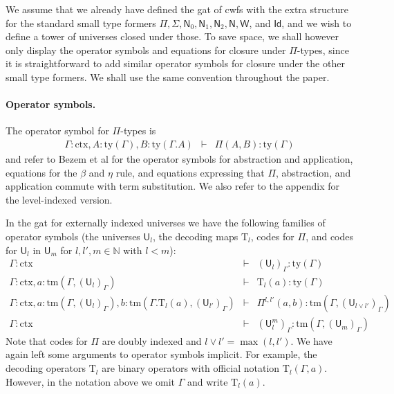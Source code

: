 \documentclass[11pt,a4paper]{article}
\theoremstyle{plain}
\theoremstyle{definition}
\newcommand{\Id}{\mathsf{Id}}
\newcommand{\UU}{\mathsf{U}}
\def\Nbb{\mathbb{N}}
\def\UU{\mathsf{U}}
\newcommand{\N}{\mathsf{N}}
\def\Pihat{\Pi}
\newcommand{\ctx}{\mathrm{ctx}}
\newcommand{\ty}{\mathrm{ty}}
\newcommand{\tm}{\mathrm{tm}}
\def\U{\mathsf{U}}
\newcommand{\Ta}{\mathrm{T}}
\def\W{\mathsf{W}}
\begin{document}
We assume that we already have defined the gat of cwfs with the extra structure for the standard small type formers $\Pi, \Sigma, \N_0, \N_1, \N_2, \N, \W$, and $\Id$, and we wish to define a tower of universes closed under those. To save space, we shall however only display the operator symbols and equations for closure under $\Pi$-types, since it is straightforward to add similar operator symbols for closure under the other small type formers. We shall use the same convention throughout the paper.

\paragraph{Operator symbols.}
The operator symbol for $\Pi$-types is
\begin{eqnarray*}
\Gamma : \ctx, A : \ty(\Gamma), B : \ty(\Gamma.A) &\vdash& \Pi(A,B) : \ty(\Gamma)
\end{eqnarray*}
and refer to Bezem et al \cite{bezem:hofmann} for the operator symbols for abstraction and application, equations for the $\beta$ and $\eta$ rule, and equations expressing that $\Pi$, abstraction, and application commute with term substitution. We also refer to the appendix for the level-indexed version.

In the gat for externally indexed universes we have the following families of operator symbols (the universes $\UU_l$, the decoding maps $\Ta_l$, codes for $\Pi$, and codes for $\UU_l$ in $\UU_m$ for $l, l' , m \in \Nbb$ with $l < m$):
\begin{eqnarray*}
\Gamma : \ctx &\vdash& (\U_{l})_\Gamma : \ty(\Gamma)\\
\Gamma : \ctx, a : \tm(\Gamma,(\U_{l})_\Gamma) &\vdash& {\Ta_{l}}(a) : \ty(\Gamma)\\
\Gamma : \ctx,
a : \tm(\Gamma,(\U_{l})_\Gamma),
b :  \tm(\Gamma . \Ta_{l}(a), (\U_{l'})_\Gamma)
&\vdash&
 \Pihat^{l,l'}(a,b) : \tm(\Gamma,(\U_{l \vee l'})_\Gamma)\\
 \Gamma : \ctx&\vdash&(\UU^m_l)_\Gamma: \tm(\Gamma,(\UU_{m})_\Gamma)
\end{eqnarray*}
Note that codes for $\Pi$ are doubly indexed and $l \vee l' = \max(l,l')$.
We have again left some arguments to operator symbols implicit. For example, the decoding operators $\Ta_l$ are binary operators with official notation $\Ta_l(\Gamma,a)$. However, in the notation above we omit $\Gamma$ and write $\Ta_l(a)$.
\end{document}
